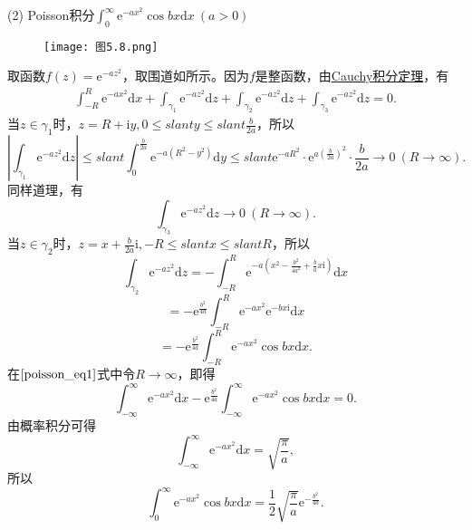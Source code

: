\documentclass[../../main.tex]{subfiles}
\begin{document}
(2) Poisson积分\(\int_{0}^{\infty} \mathrm{e}^{-ax^2} \cos bx \mathrm{d}x \ (a > 0)\)
\begin{figure}[H]
\centering
\texttt{[image: 图5.8.png]}
\caption{}
\label{figure:图5.8}
\end{figure}
取函数\( f(z) = \mathrm{e}^{-az^2} \)，取围道如所示。因为\( f \)是整函数，由\hyperref[theorem:Cauchy-Goursat定理(Cauchy积分定理)]{Cauchy积分定理}，有
\begin{align}
\int_{-R}^{R} \mathrm{e}^{-ax^2} \mathrm{d}x + \int_{\gamma_1} \mathrm{e}^{-az^2} \mathrm{d}z + \int_{\gamma_2} \mathrm{e}^{-az^2} \mathrm{d}z + \int_{\gamma_3} \mathrm{e}^{-az^2} \mathrm{d}z = 0. \label{poisson_eq1}
\end{align}
当\( z \in \gamma_1 \)时，\( z = R + \mathrm{i}y, 0 \leqslant slant y \leqslant slant \frac{b}{2a} \)，所以
\[
\left| \int_{\gamma_1} \mathrm{e}^{-az^2} \mathrm{d}z \right| \leqslant slant \int_{0}^{\frac{b}{2a}} \mathrm{e}^{-a(R^2 - y^2)} \mathrm{d}y
\leqslant slant \mathrm{e}^{-aR^2} \cdot \mathrm{e}^{a\left( \frac{b}{2a} \right)^2} \cdot \frac{b}{2a}
\to 0 \ (R \to \infty).
\]
同样道理，有
\[
\int_{\gamma_3} \mathrm{e}^{-az^2} \mathrm{d}z \to 0 \ (R \to \infty).
\]
当\( z \in \gamma_2 \)时，\( z = x + \frac{b}{2a} \mathrm{i}, -R \leqslant slant x \leqslant slant R \)，所以
\[
\int_{\gamma_2} \mathrm{e}^{-az^2} \mathrm{d}z = - \int_{-R}^{R} \mathrm{e}^{-a \left( x^2 - \frac{b^2}{4a^2} + \frac{b}{a} x \mathrm{i} \right)} \mathrm{d}x
\]
\[
= - \mathrm{e}^{\frac{b^2}{4a}} \int_{-R}^{R} \mathrm{e}^{-ax^2} \mathrm{e}^{-b x \mathrm{i}} \mathrm{d}x
\]
\[
= - \mathrm{e}^{\frac{b^2}{4a}} \int_{-R}^{R} \mathrm{e}^{-ax^2} \cos bx \mathrm{d}x.
\]
在\(\eqref{poisson_eq1}\)式中令\( R \to \infty \)，即得
\[
\int_{-\infty}^{\infty} \mathrm{e}^{-ax^2} \mathrm{d}x - \mathrm{e}^{\frac{b^2}{4a}} \int_{-\infty}^{\infty} \mathrm{e}^{-ax^2} \cos bx \mathrm{d}x = 0.
\]
由概率积分可得
\[
\int_{-\infty}^{\infty} \mathrm{e}^{-ax^2} \mathrm{d}x = \sqrt{\frac{\pi}{a}},
\]
所以
\[
\int_{0}^{\infty} \mathrm{e}^{-ax^2} \cos bx \mathrm{d}x = \frac{1}{2} \sqrt{\frac{\pi}{a}} \mathrm{e}^{-\frac{b^2}{4a}}.
\]
\end{document}
